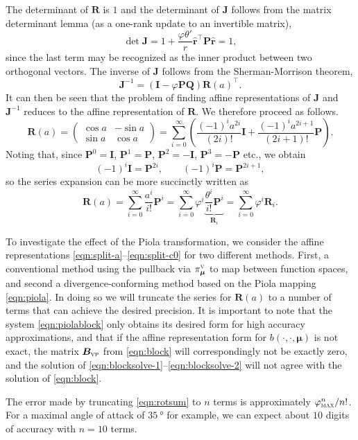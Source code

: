 \documentclass[onecolumn, twoside, a4paper, 11pt]{article}
\begin{document}
The determinant of $\bm R$ is $1$ and the determinant of $\bm J$ follows
from the matrix determinant lemma (as a one-rank update to an invertible
matrix),
\[
  \det \bm J = 1 + \frac{\varphi\theta'}{r} \hat{\bm r}^\intercal \bm P \hat{\bm r} = 1,
\]
since the last term may be recognized as the inner product between two
orthogonal vectors. The inverse of $\bm J$ follows from the Sherman-Morrison theorem,
\[
  \bm J^{-1} = \left( \bm I - \varphi \bm P \bm Q \right)
  \bm R(a)^\intercal.
\]
It can then be seen that the problem of finding affine representations of
$\bm J$ and $\bm J^{-1}$ reduces to the affine representation of $\bm R$.
We therefore proceed as follows.
\[
  \bm R(a)
  = \begin{pmatrix} \cos a & -\sin a \\ \sin a & \cos a \end{pmatrix}
  = \sum_{i=0}^\infty \left( \frac{(-1)^i a^{2i}}{(2i)!} \bm I
    + \frac{(-1)^i a^{2i+1}}{(2i+1)!} \bm P \right).
\]
Noting that, since $\bm P^0 = \bm I$, $\bm P^1 = \bm P$, $\bm P^2 = -\bm I$,
$\bm P^3 = -\bm P$ etc., we obtain
\[
  (-1)^i \bm I = \bm P^{2i}, \qquad (-1)^i \bm P = \bm P^{2i+1},
\]
so the series expansion can be more succinctly written as
\begin{equation}
  \label{eqn:rotsum}
  \bm R(a) = \sum_{i=0}^\infty \frac{a^i}{i!} \bm P^i
  = \sum_{i=0}^\infty \varphi^i \underbrace{\frac{\theta^i}{i!}\bm P^i}_{\bm R_i}
  = \sum_{i=0}^\infty \varphi^i \bm R_i.
\end{equation}

To investigate the effect of the Piola transformation, we consider the affine representations
\eqref{eqn:split-a}--\eqref{eqn:split-c0} for two different methods. First, a conventional method
using the pullback via $\pi_{\bm \mu}^\textsc{v}$ to map between function spaces, and second a
divergence-conforming method based on the Piola mapping \eqref{eqn:piola}.  In doing so we will
truncate the series for $\bm R(a)$ to a number of terms that can achieve the desired precision. It
is important to note that the system \eqref{eqn:piolablock} only obtains its desired form for high
accuracy approximations, and that if the affine representation form for $b(\cdot,\cdot,\bm \mu)$ is
not exact, the matrix $\bm B_\textsc{vp}$ from \eqref{eqn:block} will correspondingly not be exactly
zero, and the solution of \eqref{eqn:blocksolve-1}--\eqref{eqn:blocksolve-2} will not agree with the
solution of \eqref{eqn:block}.

The error made by truncating \eqref{eqn:rotsum} to $n$ terms is approximately
$\varphi_\textsc{max}^n / n!$. For a maximal angle of attack of
$\SI{35}{\degree}$ for example, we can expect about $10$ digits of accuracy
with $n=10$ terms.
\end{document}
